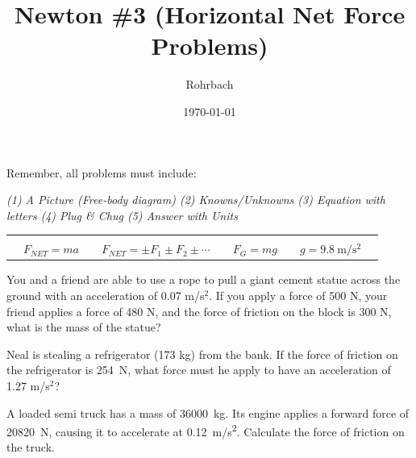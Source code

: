 \documentclass[10pt]{exam}
\title{Newton \#3 (Horizontal Net Force Problems)}
\author{Rohrbach}
\date{\today}
\newcommand{\printeqs}{
  \begin{center}
    \begin{tabular}{|*9c|}
      \hline 
      &&&&&&&&\\
      &
      $F_{NET}=ma$ &&
      $F_{NET}=\pm F_1 \pm F_2 \pm \cdots$ &&
      $F_G=mg$ &&
      $g=\SI{9.8}{\meter\per\second^2}$ &
      \\
      \hline
    \end{tabular}
  \end{center}
}
\begin{document}
\maketitle

\noindent
Remember, all problems must include:

\begin{center}
  \it
   (1) A Picture (Free-body diagram) \hspace{3em}    
   (2) Knowns/Unknowns \hspace{3em}    
   (3) Equation with letters \hspace{3em}
   (4) Plug \& Chug  \hspace{5em}
   (5) Answer with Units
\end{center}

\printeqs

\begin{questions}
  
    \question
      You and a friend are able to use a rope to pull a giant cement statue across the ground with an acceleration of 0.07 m/s$^2$.  If you apply a force of 500 N, your friend applies a force of 480 N, and the force of friction on the block is 300 N, what is the mass of the statue?
      \vs

    \question
      Neal is stealing a refrigerator (173 kg) from the bank.  If the force of friction on the refrigerator is 254~N, what force must he apply to have an acceleration of 1.27 m/s$^2$?
      \vs

    \question
      A loaded semi truck has a mass of \SI{36000}{kg}.  Its engine applies a forward force of \SI{20820}{N}, causing it to accelerate at \SI{0.12}{m/s^2}.  Calculate the force of friction on the truck.
      \vs

  

\end{questions}
\end{document}
